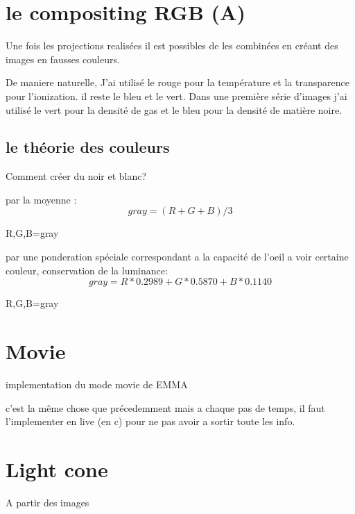 \section{le compositing RGB (A)}
Une fois les projections realisées il est possibles de les combinées en créant des images en fausses couleurs.

De maniere naturelle, J'ai utilisé le rouge pour  la température et la transparence pour l'ionization.
il reste le bleu et le vert.
Dans une première série d'images j'ai utilisé le vert pour la densité de gas et le bleu pour la densité de matière noire.

\subsection{le théorie des couleurs}
Comment créer du noir et blanc?


par la moyenne :
\begin{equation}
gray= (R+G+B)/3
\end{equation}

R,G,B=gray


par une ponderation spéciale correspondant a la capacité de l'oeil a voir certaine couleur, conservation de la luminance:
\begin{equation}
gray = R*0.2989 + G*0.5870 +B*0.1140
\end{equation}

R,G,B=gray


\section{Movie}
implementation du mode movie de EMMA

c'est la même chose que précedemment mais a chaque pas de temps, il faut l'implementer en live (en c) pour ne pas avoir a sortir toute les info.

\section{Light cone}
A partir des images


